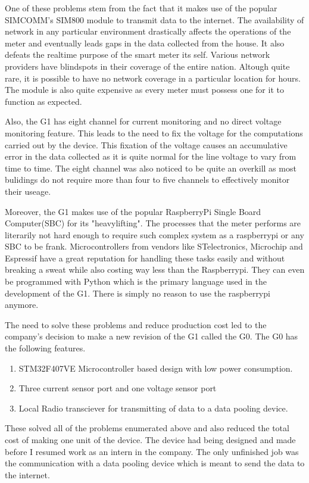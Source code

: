 One of these problems stem from the fact that it makes use of the popular SIMCOMM's SIM800 module to transmit data to the internet. The availability of network in any particular environment drastically affects the operations of the meter and eventually leads gaps in the data collected from the house. It also defeats the realtime purpose of the smart meter its self. Various network providers have blindspots in their coverage of the entire nation. Altough quite rare, it is possible to have no network coverage in a particular location for hours. The module is also quite expensive as every meter must possess one for it to function as expected. 

Also, the G1 has eight channel for current monitoring and no direct voltage monitoring feature. This leads to the need to fix the voltage for the computations carried out by the device. This fixation of the voltage causes an accumulative error in the data collected as it is quite normal for the line voltage to vary from time to time. The eight channel was also noticed to be quite an overkill as most bulidings do not require more than four to five channels to effectively monitor their useage.

Moreover, the G1 makes use of the popular RaspberryPi Single Board Computer(SBC) for its "heavylifting". The processes that the meter performs are literarily not hard enough to require such complex system as a raspberrypi or any SBC to be frank. Microcontrollers from vendors like STelectronics, Microchip and Espressif have a great reputation for handling these tasks easily and without breaking a sweat while also costing way less than the Raspberrypi. They can even be programmed with Python which is the primary language used in the development of the G1. There is simply no reason to use the raspberrypi anymore.

The need to solve these problems and reduce production cost led to the company's decision to make a new revision of the G1 called the G0. The G0 has the following features.
\begin{enumerate}
\item STM32F407VE Microcontroller based design with low power consumption.
\item Three current sensor port and one voltage sensor port
\item Local Radio transciever for transmitting of data to a data pooling device.
\end{enumerate}
These solved all of the problems enumerated above and also reduced the total cost of making one unit of the device. The device had being designed and made before I resumed work as an intern in the company. The only unfinished job was the communication with a data pooling device which is meant to send the data to the internet.

